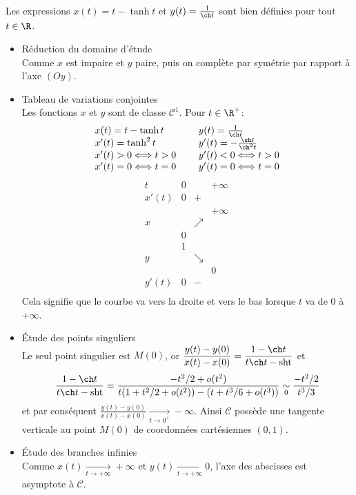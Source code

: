 {\begin{enumerate}
{\begin{center}
\begin{tikzpicture}[scale=4]
\end{tikzpicture}  
\end{center}
Les expressions $x(t)=t-\tanh t$ et $y(t)=\frac{1}{\ch t}$ sont bien définies pour tout $t\in\R$.
\begin{itemize}
\item Réduction du domaine d'étude\\
Comme $x$ est impaire et $y$ paire,  puis on complète par symétrie par rapport à l'axe $(Oy)$.
\item Tableau de variations conjointes\\
Les fonctions $x$ et $y$ sont de classe $\mathcal{C}^1$. Pour $t\in\R^+$:
$$\begin{array}{lcl}
x(t)=t-\tanh t&\ &y(t)=\frac{1}{\ch t}\\
x'(t)=\tanh ^2t&\ &y'(t)=-\frac{\sh t}{\ch ^2t}\\
x'(t)>0\Longleftrightarrow t>0&\ &y'(t)<0\Longleftrightarrow t>0\\
x'(t)=0\Longleftrightarrow t=0 &\ &y'(t)=0\Longleftrightarrow t=0
\end{array}$$
$$\begin{array}{c|lcr}
t&0&\ &+\infty\\\hline
x'(t)&0&+&\ \\\hline
\ &  &\ &+\infty\ \\
x&\ &\nearrow &\ \\
\ &0 &\ & \\\hline
\ &1 &\ & \\
y&\ &\searrow &\ \\
\ & &\ & 0\\\hline
y'(t)&0& - &\ \\
\end{array}$$
Cela signifie que le courbe va vers la droite et vers le bas lorsque $t$ va de $0$ à $+\infty$.
\item \'Etude des points singuliers\\
Le seul point singulier est $M(0)$, or $\displaystyle \frac{y(t)-y(0)}{x(t)-x(0)}=\frac{1-\ch t}{t\ch t-\mathrm{sh t}}$ et 
$$\frac{1-\ch t}{t\ch t-\mathrm{sh t}}=\frac{-t^2/2+o(t^2)}{t(1+t^2/2+o(t^2))-(t+t^3/6+o(t^3))}\underset{0}{\sim}\frac{-t^2/2}{t^3/3}$$ 
et par conséquent $\frac{y(t)-y(0)}{x(t)-x(0)}\xrightarrow[t\to 0^+]{}-\infty$. Ainsi $\mathcal{C}$ possède une tangente verticale au point $M(0)$ de coordonnées cartésiennes $(0,1)$.
\item \'Etude des branches infinies\\
Comme $x(t)\xrightarrow[t\to+\infty]{}+\infty$ et $y(t)\xrightarrow[t\to+\infty]{}0$, l'axe des abscisses est asymptote à $\mathcal{C}$.
\end{itemize}

}
\end{enumerate}}
